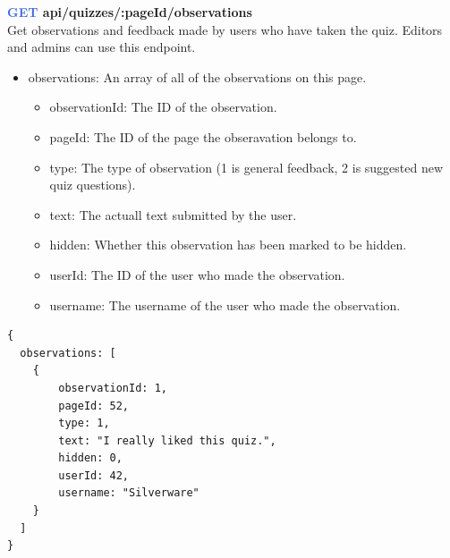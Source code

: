 \documentclass[onecolumn, draftclsnofoot,10pt, compsoc, usenames, dvipsnames]{IEEEtran}
\begin{document}
\noindent
\textbf{\textcolor{RoyalBlue}{GET} api/quizzes/:pageId/observations} \\
Get observations and feedback made by users who have taken the quiz. Editors and admins can use this endpoint.
\begin{itemize}
    \item observations: An array of all of the observations on this page.
    \begin{itemize}
        \item observationId: The ID of the observation.
        \item pageId: The ID of the page the obseravation belongs to.
        \item type: The type of observation (1 is general feedback, 2 is suggested new quiz questions).
        \item text: The actuall text submitted by the user.
        \item hidden: Whether this observation has been marked to be hidden.
        \item userId: The ID of the user who made the observation.
        \item username: The username of the user who made the observation.
    \end{itemize}
\end{itemize}
\begin{lstlisting}[caption=Example Response]
{ 
  observations: [
    {
        observationId: 1,
        pageId: 52,
        type: 1,
        text: "I really liked this quiz.",
        hidden: 0,
        userId: 42,
        username: "Silverware"
    }
  ]
}
\end{lstlisting}
\\~\\
\end{document}
